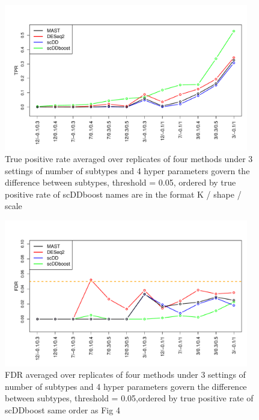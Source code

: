 \documentclass[aoas,preprint]{imsart}
\begin{document}
\begin{figure}[H]
  \includegraphics[width = 0.95\textwidth]{Figs/simuTPR.pdf}
  \caption{True positive rate averaged over replicates of four methods under 3 settings of number of subtypes and 4 hyper parameters govern the difference between subtypes, threshold = 0.05, ordered by true positive rate of scDDboost
  names are in the format K / shape / scale}
  \label{fig:4}
\end{figure}




\begin{figure}[H]
  \includegraphics[width = 0.95\textwidth]{Figs/simuFDR.pdf}
  \caption{FDR averaged over replicates of four methods under 3 settings of number of subtypes and 4 hyper parameters govern the difference between subtypes, threshold = 0.05,ordered by true positive rate of scDDboost same order as Fig 4
  }
  \label{fig:5}
\end{figure}
\end{document}
